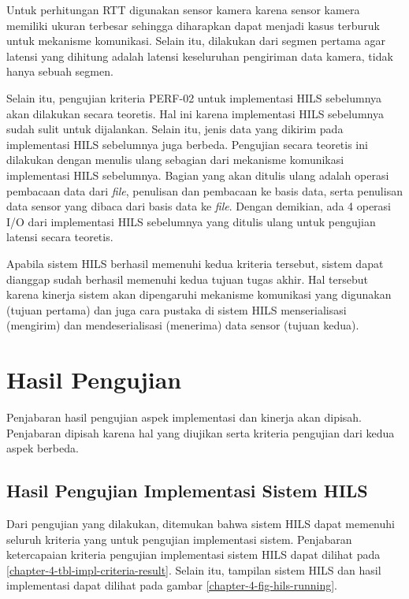 Untuk perhitungan RTT digunakan sensor kamera karena sensor kamera memiliki
ukuran terbesar sehingga diharapkan dapat menjadi kasus terburuk untuk mekanisme
komunikasi. Selain itu, dilakukan dari segmen pertama agar latensi yang dihitung
adalah latensi keseluruhan pengiriman data kamera, tidak hanya sebuah segmen.

Selain itu, pengujian kriteria PERF-02 untuk implementasi HILS sebelumnya akan
dilakukan secara teoretis. Hal ini karena implementasi HILS sebelumnya sudah
sulit untuk dijalankan. Selain itu, jenis data yang dikirim pada implementasi
HILS sebelumnya juga berbeda. Pengujian secara teoretis ini dilakukan dengan
menulis ulang sebagian dari mekanisme komunikasi implementasi HILS sebelumnya.
Bagian yang akan ditulis ulang adalah operasi pembacaan data dari \textit{file},
penulisan dan pembacaan ke basis data, serta penulisan data sensor yang dibaca
dari basis data ke \textit{file}. Dengan demikian, ada 4 operasi I/O dari
implementasi HILS sebelumnya yang ditulis ulang untuk pengujian latensi secara
teoretis.

Apabila sistem HILS berhasil memenuhi kedua kriteria tersebut, sistem dapat
dianggap sudah berhasil memenuhi kedua tujuan tugas akhir. Hal tersebut karena
kinerja sistem akan dipengaruhi mekanisme komunikasi yang digunakan (tujuan
pertama) dan juga cara pustaka di sistem HILS menserialisasi (mengirim) dan
mendeserialisasi (menerima) data sensor (tujuan kedua).

\section{Hasil Pengujian}

Penjabaran hasil pengujian aspek implementasi dan kinerja akan dipisah.
Penjabaran dipisah karena hal yang diujikan serta kriteria pengujian dari kedua
aspek berbeda.

\subsection{Hasil Pengujian Implementasi Sistem HILS}

Dari pengujian yang dilakukan, ditemukan bahwa sistem HILS dapat memenuhi
seluruh kriteria yang untuk pengujian implementasi sistem. Penjabaran
ketercapaian kriteria pengujian implementasi sistem HILS dapat dilihat pada
\ref{chapter-4-tbl-impl-criteria-result}. Selain itu, tampilan sistem HILS dan
hasil implementasi dapat dilihat pada gambar \ref{chapter-4-fig-hils-running}.

